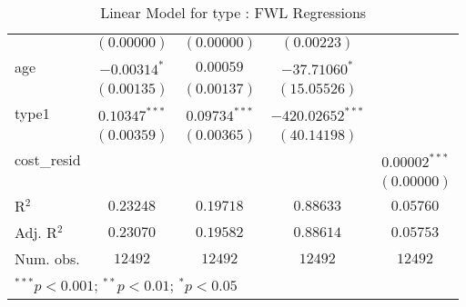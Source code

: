 \begin{table}
\begin{center}
\begin{tabular}{l c c c c}
                 & $(0.00000)$      & $(0.00000)$      & $(0.00223)$          &                 \\
age              & $-0.00314^{*}$   & $0.00059$        & $-37.71060^{*}$      &                 \\
                 & $(0.00135)$      & $(0.00137)$      & $(15.05526)$         &                 \\
type1            & $0.10347^{***}$  & $0.09734^{***}$  & $-420.02652^{***}$   &                 \\
                 & $(0.00359)$      & $(0.00365)$      & $(40.14198)$         &                 \\
cost\_resid      &                  &                  &                      & $0.00002^{***}$ \\
                 &                  &                  &                      & $(0.00000)$     \\
\hline
R$^2$            & $0.23248$        & $0.19718$        & $0.88633$            & $0.05760$       \\
Adj. R$^2$       & $0.23070$        & $0.19582$        & $0.88614$            & $0.05753$       \\
Num. obs.        & $12492$          & $12492$          & $12492$              & $12492$         \\
\hline
\multicolumn{5}{l}{\scriptsize{$^{***}p<0.001$; $^{**}p<0.01$; $^{*}p<0.05$}}
\end{tabular}
\caption{Linear Model for type : FWL Regressions}
\label{tab:reg_eng_fwl}
\end{center}
\end{table}
